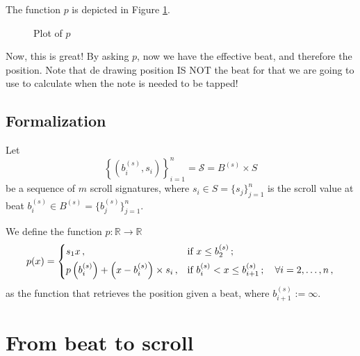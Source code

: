 \documentclass[a4paper,9pt]{article}
\begin{document}
    The function $p$ is depicted in Figure \ref{fig:beat2effective-bps}.
\begin{figure}[htpb]
	\centering

\caption{Plot of $p$}
	\label{fig:beat2effective-bps}
\end{figure}
Now, this is great! By asking $p$, now we have the effective beat, and therefore the position. Note that de drawing position IS NOT the beat for that we are going to use to calculate when the note is needed to be tapped!
    \subsection{Formalization}

    Let
    \begin{equation}
	    \left\{ \left( b_{i}^{(s)},s_{i} \right) \right\} _{i=1}^{n} = \mathcal{S} = B^{(s)} \times S
	    \label{eq:S}
    \end{equation}
    be a sequence of $m$ scroll signatures, where $s_i \in S = \{s_j\}_{j=1}^{n}$ is the scroll value at beat $b_i^{(s)} \in B^{(s)}= \{b_j^{(s)}\}_{j=1}^{n}$.

    We define the function $ p: \mathbb{R}\rightarrow \mathbb{R} $
    \begin{equation}
	    p(x) =  \begin{dcases}
		    s_1x\,, & \text{if $ x \leq b^{(s)}_2 $}\,;\\
		    p \left( b^{(s)}_i \right) + \left( x-b^{(s)}_i \right) \times s_i\,, & \text{if $ b^{(s)}_{i} < x \leq b^{(s)}_{i+1}\,; \quad \forall i=2,\dots,n$}\,,
	    \end{dcases}
	    \label{eq:position-final}
    \end{equation}
    as the function that retrieves the position given a beat, where $ b^{(s)}_{i+1} := \infty $.
    \section{From beat to scroll}
\end{document}
